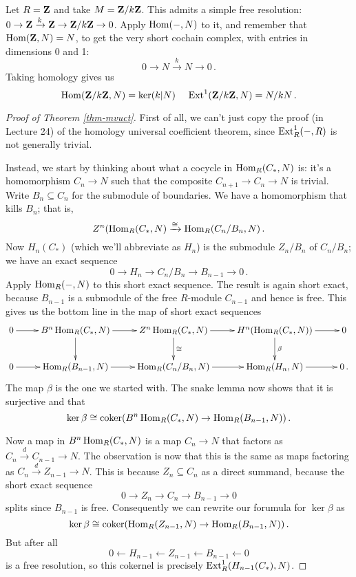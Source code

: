 \begin{example}
Let $R=\mathbf Z$ and take $M=\mathbf Z/k\mathbf Z$. This admits a simple free resolution:
$0\to \mathbf Z\xrightarrow{k}\mathbf Z\to\mathbf Z/k\mathbf Z\to 0$. Apply $\operatorname{Hom}(-,N)$ to it,
and remember that $\operatorname{Hom}(\mathbf Z,N)=N$, to get 
the very short cochain complex, with entries in dimensions 0 and 1:
\[
0\to N\xrightarrow{k} N\to0\,.
\]
Taking homology gives us
\[
\operatorname{Hom}(\mathbf Z/k\mathbf Z,N)=\ker(k|N)\,\quad\operatorname{Ext}^1(\mathbf Z/k\mathbf Z,N)=N/kN\,.
\]
\end{example}

\begin{proof}[Proof of Theorem \ref{thm-mvuct}]
First of all, we can't just copy the proof (in Lecture 24) of the
homology universal coefficient theorem, since $\operatorname{Ext}^1_R(-,R)$ is not
generally trivial. 

Instead, we start by thinking about what a cocycle in $\operatorname{Hom}_R(C_*,N)$ is:
it's a homomorphism $C_n\to N$ such that the composite $C_{n+1}\to C_n\to N$ 
is trivial. Write $B_n\subseteq C_n$ for the submodule of boundaries.
We have a homomorphism that kills $B_n$; that is,
\[
Z^n(\operatorname{Hom}_R(C_*,N)\xrightarrow{\cong}\operatorname{Hom}_R(C_n/B_n,N)\,.
\]
Now $H_n(C_*)$ (which we'll abbreviate as $H_n$) is the submodule
$Z_n/B_n$ of $C_n/B_n$; we have an exact sequence
\begin{equation*}
0\to H_n\to C_n/B_n\to B_{n-1}\to0\,.
\end{equation*}
Apply $\operatorname{Hom}_R(-,N)$ to this short exact sequence. The result is again 
short exact, because $B_{n-1}$ is a submodule of the free $R$-module $C_{n-1}$
and hence is free. This gives us the bottom line in the map of short
exact sequences
\[
\xymatrix{
0 \ar[r] & B^n\Hom_R(C_*,N) \ar[r] \ar[d] & 
Z^n\Hom_R(C_*,N) \ar[d]^\cong \ar[r]
& H^n(\Hom_R(C_*,N)) \ar[d]^\beta \ar[r] & 0\\
0 \ar[r] & \Hom_R(B_{n-1},N) \ar[r] & \Hom_R(C_n/B_n,N) \ar[r] & 
\Hom_R(H_n,N) \ar[r] & 0\,.
}\]
The map $\beta$ is the one we started with. The snake lemma
now shows that it is surjective and that
\[
\ker\beta\cong\operatorname{coker}(B^n\operatorname{Hom}_R(C_*,N)\to\operatorname{Hom}_R(B_{n-1},N))\,.
\]

Now a map in $B^n\operatorname{Hom}_R(C_*,N)$ is a map $C_n\to N$ that factors as
$C_n\xrightarrow{d}C_{n-1}\to N$. The observation is now that this is
the same as maps factoring as $C_n\xrightarrow{d}Z_{n-1}\to N$. 
This is because $Z_n\subseteq C_n$ as a direct summand, because
the short exact sequence 
\[
0\to Z_n\to C_n\to B_{n-1}\to0
\]
splits since $B_{n-1}$ is free. Consequently we can rewrite our forumula for
$\ker\beta$ as 
\[
\ker\beta\cong\operatorname{coker}(\operatorname{Hom}_R(Z_{n-1},N)\to\operatorname{Hom}_R(B_{n-1},N))\,.
\]
But after all 
\[
0\leftarrow H_{n-1}\leftarrow Z_{n-1}\leftarrow B_{n-1}\leftarrow0
\]
is a free resolution, so this cokernel is precisely 
$\operatorname{Ext}_R^1(H_{n-1}(C_*),N)$.
\end{proof}


